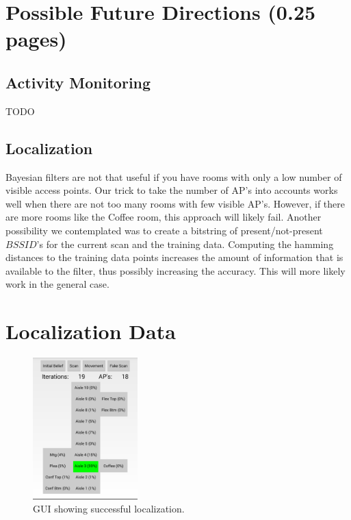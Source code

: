 \documentclass[a4paper,10pt,twoside]{IEEEtran}
\begin{document}
\section{Possible Future Directions (0.25 pages)}
\label{sec:future-directions}
\subsection{Activity Monitoring}
TODO

\subsection{Localization}
Bayesian filters are not that useful if you have rooms with only a low number of visible access points.
Our trick to take the number of AP's into accounts works well when there
are not too many rooms with few visible AP's.
However, if there are more rooms like the Coffee room, this approach will likely fail.
Another possibility we contemplated was to create a bitstring of present/not-present $BSSID$'s for the current scan and the training data.
Computing the hamming distances to the training data points increases the amount of information that
is available to the filter, thus possibly increasing the accuracy.
This will more likely work in the general case.

%
%

\newpage
\appendix

%
\section{Localization Data}

\begin{figure}[h!]
  \centering
    \includegraphics[width=0.36\textwidth]{screenshot}
    \caption{GUI showing successful localization.}
    \label{fig:screenshot}
\end{figure}
\end{document}
